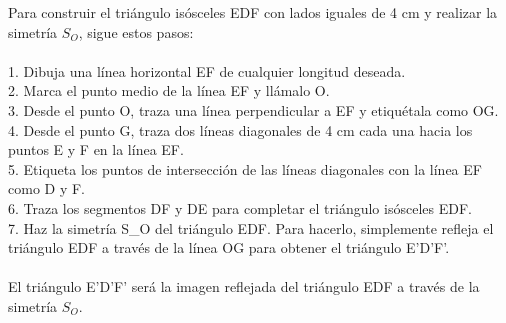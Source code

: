 \documentclass{article}
\begin{document}
Para construir el triángulo isósceles EDF con lados iguales de 4 cm y realizar la simetría $S_O$, sigue estos pasos:\\
\\
1. Dibuja una línea horizontal EF de cualquier longitud deseada.\\
2. Marca el punto medio de la línea EF y llámalo O.\\
3. Desde el punto O, traza una línea perpendicular a EF y etiquétala como OG.\\
4. Desde el punto G, traza dos líneas diagonales de 4 cm cada una hacia los puntos E y F en la línea EF.\\
5. Etiqueta los puntos de intersección de las líneas diagonales con la línea EF como D y F.\\
6. Traza los segmentos DF y DE para completar el triángulo isósceles EDF.\\
7. Haz la simetría S\_O del triángulo EDF. Para hacerlo, simplemente refleja el triángulo EDF a través de la línea OG para obtener el triángulo E'D'F'.\\
\\
El triángulo E'D'F' será la imagen reflejada del triángulo EDF a través de la simetría $S_O$.\\
\end{document}
